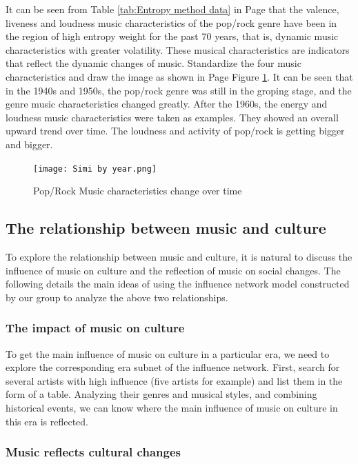 \documentclass[12pt]{article}  %
\begin{document}
It can be seen from Table \ref{tab:Entropy method data} in Page \pageref{tab:Entropy method data} that the valence, liveness and loudness music characteristics of the pop/rock genre have been in the region of high entropy weight for the past 70 years, that is, dynamic music characteristics with greater volatility. These musical characteristics are indicators that reflect the dynamic changes of music. Standardize the four music characteristics and draw the image as shown in Page \pageref{fig:changeovertime} Figure \ref{fig:changeovertime}. It can be seen that in the 1940s and 1950s, the pop/rock genre was still in the groping stage, and the genre music characteristics changed greatly. After the 1960s, the energy and loudness music characteristics were taken as examples. They showed an overall upward trend over time. The loudness and activity of pop/rock is getting bigger and bigger. 

\begin{figure}[htbp]
\centering
\texttt{[image: Simi by year.png]}
\caption{Pop/Rock Music characteristics change over time}\label{fig:changeovertime}
\end{figure}

\subsection{The relationship between music and culture}


To explore the relationship between music and culture, it is natural to discuss the influence of music on culture and the reflection of music on social changes. The following details the main ideas of using the influence network model constructed by our group to analyze the above two relationships. 

\subsubsection{The impact of music on culture }

To get the main influence of music on culture in a particular era, we need to explore the corresponding era subnet of the influence network. First, search for several artists with high influence (five artists for example) and list them in the form of a table. Analyzing their genres and musical styles, and combining historical events, we can know where the main influence of music on culture in this era is reflected. 

\subsubsection{Music reflects cultural changes}
\end{document}
